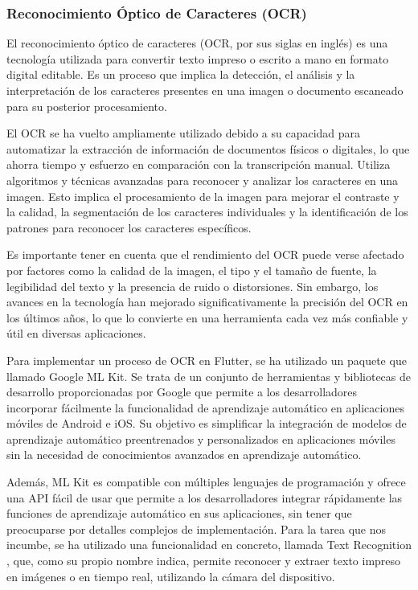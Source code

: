 \documentclass{article}
\begin{document}
\subsubsection{Reconocimiento Óptico de Caracteres (OCR)}

El reconocimiento óptico de caracteres (OCR, por sus siglas en inglés) es una tecnología utilizada para convertir texto impreso o escrito a mano en formato digital editable. Es un proceso que implica la detección, el análisis y la interpretación de los caracteres presentes en una imagen o documento escaneado para su posterior procesamiento.

El OCR se ha vuelto ampliamente utilizado debido a su capacidad para automatizar la extracción de información de documentos físicos o digitales, lo que ahorra tiempo y esfuerzo en comparación con la transcripción manual. Utiliza algoritmos y técnicas avanzadas para reconocer y analizar los caracteres en una imagen. Esto implica el procesamiento de la imagen para mejorar el contraste y la calidad, la segmentación de los caracteres individuales y la identificación de los patrones para reconocer los caracteres específicos.

Es importante tener en cuenta que el rendimiento del OCR puede verse afectado por factores como la calidad de la imagen, el tipo y el tamaño de fuente, la legibilidad del texto y la presencia de ruido o distorsiones. Sin embargo, los avances en la tecnología han mejorado significativamente la precisión del OCR en los últimos años, lo que lo convierte en una herramienta cada vez más confiable y útil en diversas aplicaciones.

Para implementar un proceso de OCR en Flutter, se ha utilizado un paquete que llamado Google ML Kit. Se trata de un conjunto de herramientas y bibliotecas de desarrollo proporcionadas por Google que permite a los desarrolladores incorporar fácilmente la funcionalidad de aprendizaje automático en aplicaciones móviles de Android e iOS. Su objetivo es simplificar la integración de modelos de aprendizaje automático preentrenados y personalizados en aplicaciones móviles sin la necesidad de conocimientos avanzados en aprendizaje automático.

Además, ML Kit es compatible con múltiples lenguajes de programación y ofrece una API fácil de usar que permite a los desarrolladores integrar rápidamente las funciones de aprendizaje automático en sus aplicaciones, sin tener que preocuparse por detalles complejos de implementación. Para la tarea que nos incumbe, se ha utilizado una funcionalidad en concreto, llamada Text Recognition \cite{Google ML Kit}, que, como su propio nombre indica, permite reconocer y extraer texto impreso en imágenes o en tiempo real, utilizando la cámara del dispositivo.
\end{document}
